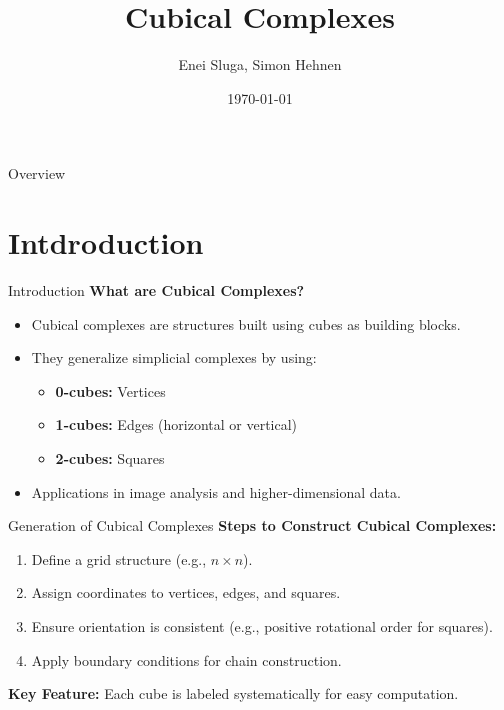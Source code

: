 \documentclass[aspectratio=169,xcolor=dvipsnames]{beamer}
\title{Cubical Complexes}
\subtitle{}
\author{Enei Sluga, Simon Hehnen}
\institute
{
    Faculty of Computer and Information Science \\
    University of Ljubljana %
}
\date{\today} %
\begin{document}
\begin{frame}
    \titlepage
\end{frame}

\begin{frame}{Overview}
    \tableofcontents
\end{frame}

\section{Intdroduction}

\begin{frame}{Introduction}
    \textbf{What are Cubical Complexes?}
    \begin{itemize}
        \item Cubical complexes are structures built using cubes as building blocks.
        \item They generalize simplicial complexes by using:
        \begin{itemize}
            \item \textbf{0-cubes:} Vertices
            \item \textbf{1-cubes:} Edges (horizontal or vertical)
            \item \textbf{2-cubes:} Squares
        \end{itemize}
        \item Applications in image analysis and higher-dimensional data.
    \end{itemize}
\end{frame}


\begin{frame}{Generation of Cubical Complexes}
    \textbf{Steps to Construct Cubical Complexes:}
    \begin{enumerate}
        \item Define a grid structure (e.g., \( n \times n \)).
        \item Assign coordinates to vertices, edges, and squares.
        \item Ensure orientation is consistent (e.g., positive rotational order for squares).
        \item Apply boundary conditions for chain construction.
    \end{enumerate}

    \vspace{1em}
    \textbf{Key Feature:} Each cube is labeled systematically for easy computation.
\end{frame}
\end{document}
